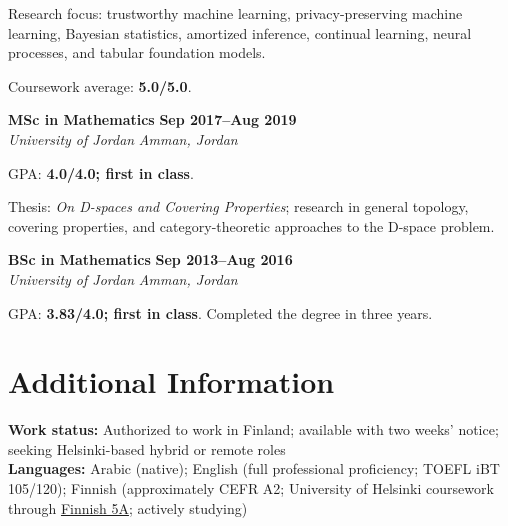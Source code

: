 \documentclass[10pt,a4paper]{article}
\newcommand{\role}[4]{%
  \textbf{#1} \hfill \textbf{#2}\\[-1pt]
  \textit{#3} \hfill \textit{#4}\par\vspace{-2pt}
}
\begin{document}
Research focus: trustworthy machine learning, privacy-preserving machine learning, Bayesian statistics, amortized inference, continual learning, neural processes, and tabular foundation models. 

Coursework average: \textbf{5.0/5.0}.

\vspace{3pt}
\role{MSc in Mathematics}{Sep 2017--Aug 2019}{University of Jordan}{Amman, Jordan}
GPA: \textbf{4.0/4.0; first in class}. 

Thesis: \textit{On D-spaces and Covering Properties}; research in general topology, covering properties, and category-theoretic approaches to the D-space problem.

\vspace{3pt}
\role{BSc in Mathematics}{Sep 2013--Aug 2016}{University of Jordan}{Amman, Jordan}
GPA: \textbf{3.83/4.0; first in class}. Completed the degree in three years.
\section{Additional Information}
\textbf{Work status:} Authorized to work in Finland; available with two weeks' notice; seeking Helsinki-based hybrid or remote roles\\
\textbf{Languages:} Arabic (native); English (full professional proficiency; TOEFL iBT 105/120); Finnish (approximately CEFR A2; University of Helsinki coursework through \href{https://studies.helsinki.fi/kurssit/toteutus/otm-67570c2a-f9ed-467f-92a7-d78330209a79}{Finnish 5A}; actively studying)\\
\end{document}
